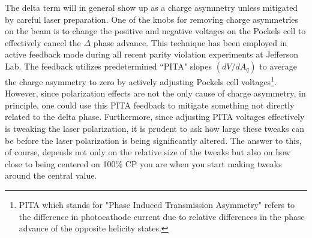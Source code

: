 \documentclass[12pt]{article}
\begin{document}
The delta term will in general show up as a charge asymmetry unless mitigated by careful laser preparation. One of the knobs for removing charge asymmetries on the beam is to change the positive and negative voltages on the Pockels cell to effectively cancel the $\Delta$ phase advance. This technique has been employed in active feedback mode during all recent parity violation experiments at Jefferson Lab. The feedback utilizes predetermined ``PITA" slopes $(dV/dA_q)$ to average the charge asymmetry to zero by actively adjusting Pockels cell voltages\footnote{PITA which stands for "Phase Induced Transmission Asymmetry" refers to the difference in photocathode current due to relative differences in the phase advance  of the opposite helicity states.}. However, since polarization effects are not the only cause of charge asymmetry, in principle, one could use this PITA feedback to mitigate something not directly related to the delta phase. Furthermore, since adjusting PITA voltages effectively is tweaking the laser polarization, it is prudent to ask how large these tweaks can be before the laser polarization is being significantly altered. The answer to this, of course, depends not only on the relative size of the tweaks but also on how close to being centered on 100\% CP you are when you start making tweaks around the central value.
\end{document}
